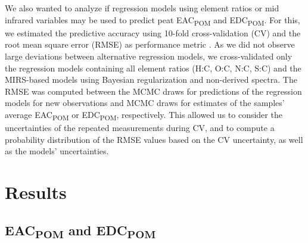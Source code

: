 \documentclass[draft,linenumbers]{agujournal2018}
\begin{document}
We also wanted to analyze if regression models using element ratios or
mid infrared variables may be used to predict peat
EAC\textsubscript{POM} and EDC\textsubscript{POM}. For this, we
estimated the predictive accuracy using 10-fold cross-validation (CV)
\citep{Roberts.2017} and the root mean square error (RMSE) as
performance metric \citep{Bellocchi.2010}. As we did not observe large
deviations between alternative regression models, we cross-validated
only the regression models containing all element ratios (H:C, O:C, N:C,
S:C) and the MIRS-based models using Bayesian regularization and
non-derived spectra. The RMSE was computed between the MCMC draws for
predictions of the regression models for new observations and MCMC draws
for estimates of the samples' average EAC\textsubscript{POM} or
EDC\textsubscript{POM}, respectively. This allowed us to consider the
uncertainties of the repeated measurements during CV, and to compute a
probability distribution of the RMSE values based on the CV uncertainty,
as well as the models' uncertainties.

\section{Results}

\subsection{\texorpdfstring{EAC\textsubscript{POM} and
EDC\textsubscript{POM}}{EAC and EDC}}
\end{document}
